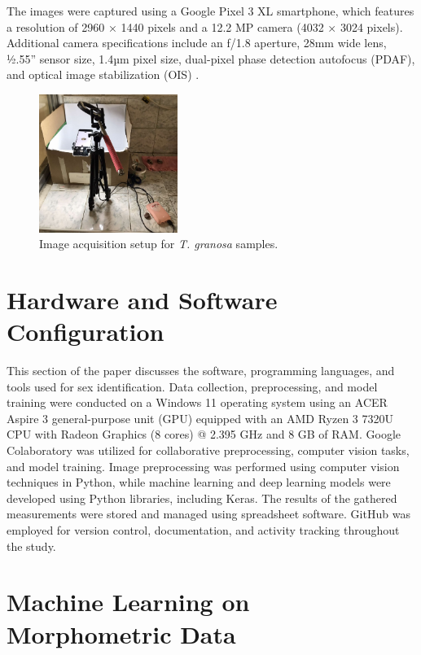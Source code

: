 The images were captured using a Google Pixel 3 XL smartphone, which features a resolution of 2960 × 1440 pixels and a 12.2 MP camera (4032 × 3024 pixels). Additional camera specifications include an f/1.8 aperture, 28mm wide lens, ½.55” sensor size, 1.4µm pixel size, dual-pixel phase detection autofocus (PDAF), and optical image stabilization (OIS) \cite{concepcion2023}.

\begin{figure}[!htbp]
	\centering
	\includegraphics[width=0.4\textwidth]{figures/setup.jpg}
	\caption{Image acquisition setup for \textit{T. granosa} samples.}
	\label{fig:setup}
\end{figure}

\section{Hardware and Software Configuration}

This section of the paper discusses the software, programming languages, and tools used for sex identification. Data collection, preprocessing, and model training were conducted on a Windows 11 operating system using an ACER Aspire 3 general-purpose unit (GPU) equipped with an AMD Ryzen 3 7320U CPU with Radeon Graphics (8 cores) @ 2.395 GHz and 8 GB of RAM. Google Colaboratory was utilized for collaborative preprocessing, computer vision tasks, and model training. Image preprocessing was performed using computer vision techniques in Python, while machine learning and deep learning models were developed using Python libraries, including Keras. The results of the gathered measurements were stored and managed using spreadsheet software. GitHub was employed for version control, documentation, and activity tracking throughout the study.

\section{Machine Learning on Morphometric Data}
\label{sec:ml models}

